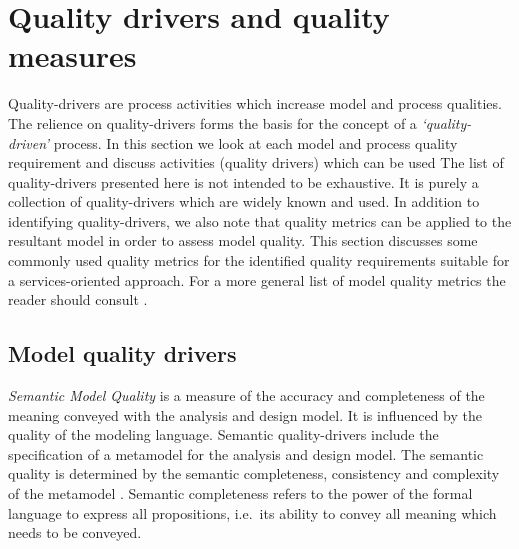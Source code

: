 \section{Quality drivers and quality measures}
\label{sec:qualityDriversAndMetrics}

Quality-drivers are process activities which increase model and process qualities. The relience on quality-drivers \cite{petersen_software_1989} forms the basis for the concept of a \emph{`quality-driven'} process. In this section we look at each model and process quality requirement and discuss activities (quality drivers) which can be used
The list of quality-drivers presented here is not intended to be exhaustive. It is purely a collection of quality-drivers which are widely known and used. In addition to identifying quality-drivers, we also note that quality metrics can be applied to the resultant model in order to assess model quality. This section discusses some commonly used quality metrics for the identified quality requirements suitable for a services-oriented approach. For a more general list of model quality metrics the reader should consult \cite{mohagheghi_existing_2009}.

\subsection{Model quality drivers}

\emph{Semantic Model Quality} is a measure of the accuracy and completeness of the meaning conveyed with the analysis and design model. It is influenced by the quality of the modeling language. Semantic quality-drivers include the specification of a metamodel for the analysis and design model. The semantic quality is determined by the semantic completeness, consistency and complexity of the metamodel \cite{buder_effects_2010}. Semantic completeness refers to the power of the formal language to express all propositions, i.e.\ its ability to convey all meaning which needs to be conveyed. 


